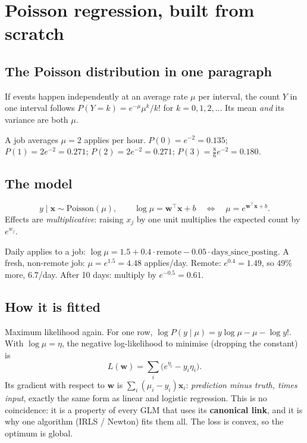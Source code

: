 \section{Poisson regression, built from scratch}

\subsection{The Poisson distribution in one paragraph}
If events happen independently at an average rate $\mu$ per interval, the count $Y$ in one interval follows
$P(Y = k) = e^{-\mu}\mu^k/k!$ for $k = 0,1,2,\dots$ Its mean \emph{and} its variance are both $\mu$.
\begin{example}
A job averages $\mu = 2$ applies per hour. $P(0) = e^{-2} = 0.135$; $P(1) = 2e^{-2} = 0.271$; $P(2) = 2e^{-2} = 0.271$;
$P(3) = \frac{8}{6}e^{-2} = 0.180$.
\end{example}

\subsection{The model}
\[ y\mid\mathbf x \sim \text{Poisson}(\mu),\qquad \log\mu = \mathbf w^\top\mathbf x + b\quad\Longleftrightarrow\quad \mu = e^{\mathbf w^\top\mathbf x + b}. \]
Effects are \emph{multiplicative}: raising $x_j$ by one unit multiplies the expected count by $e^{w_j}$.

\begin{example}
Daily applies to a job: $\log\mu = 1.5 + 0.4\cdot\text{remote} - 0.05\cdot\text{days\_since\_posting}$.
A fresh, non-remote job: $\mu = e^{1.5} = 4.48$ applies/day. Remote: $e^{0.4} = 1.49$, so 49\% more, $6.7$/day.
After 10 days: multiply by $e^{-0.5} = 0.61$.
\end{example}

\subsection{How it is fitted}
Maximum likelihood again. For one row, $\log P(y\mid\mu) = y\log\mu - \mu - \log y!$. With $\log\mu = \eta$, the
negative log-likelihood to minimise (dropping the constant) is
\[ L(\mathbf w) = \sum_i\big(e^{\eta_i} - y_i\eta_i\big). \]
Its gradient with respect to $\mathbf w$ is $\sum_i(\mu_i - y_i)\mathbf x_i$: \emph{prediction minus truth, times input},
exactly the same form as linear and logistic regression. This is no coincidence: it is a property of every GLM that uses
its \textbf{canonical link}, and it is why one algorithm (IRLS / Newton) fits them all. The loss is convex, so the optimum
is global.

